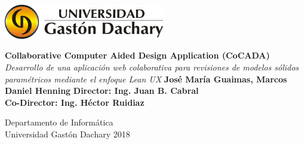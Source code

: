 \documentclass[a4paper,12pt]{report}
\begin{document}




\thispagestyle{empty}
\begin{flushright}
\includegraphics[width=7cm]{Img/ugdlogo.jpg}
\end{flushright}	
\vskip40mm
\begin{center}
\huge\textbf{Collaborative Computer Aided Design Application (CoCADA)}
\vskip2mm
\large\textit{Desarrollo de una aplicación web colaborativa para revisiones de modelos sólidos paramétricos mediante el enfoque Lean UX}
\vskip5mm
\Large\textbf{José María Guaimas, Marcos Daniel Henning}
\vskip5mm
\Large\textbf{Director: Ing. Juan B. Cabral}\\
\Large\textbf{Co-Director: Ing. Héctor Ruidiaz}
\normalsize
\end{center}
\vfill
\begin{flushright}
\large
Departamento de Informática \\
Universidad Gastón Dachary 2018\\

\end{flushright}		


	

\end{document}
